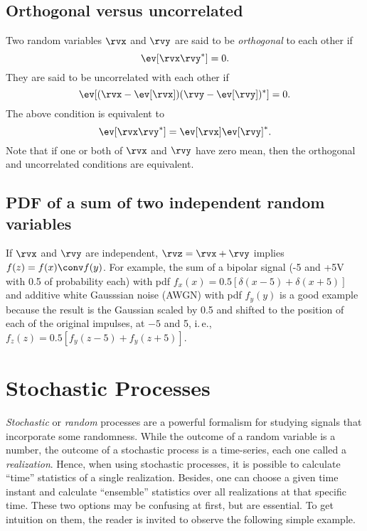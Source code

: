 \subsection{Orthogonal versus uncorrelated}

Two random variables $\rvx$ and $\rvy$ are said to be \emph{orthogonal} to each other if 
\[
\ev[\rvx \rvy^*]=0.
\]
They are said to be uncorrelated with each other if
\[
\ev[(\rvx-\ev[\rvx]) (\rvy-\ev[\rvy])^*]=0.
\]
The above condition is equivalent to
\[
\ev[\rvx \rvy^*]=\ev[\rvx]\ev[\rvy]^*.
\]
Note that if one or both of $\rvx$ and $\rvy$ have zero mean, then the orthogonal and uncorrelated conditions are equivalent.

 
\subsection{PDF of a sum of two independent random variables}

If $\rvx$ and $\rvy$ are independent, $\rvz=\rvx+\rvy$ implies $f(z) = f(x) \conv f(y)$. For example, the sum of a bipolar signal (-5 and +5V with 0.5 of probability each) with pdf $f_x(x) = 0.5 [\delta(x-5) + \delta(x+5)]$ and additive white Gausssian noise (AWGN) with pdf $f_y(y)$ is a good example because the result is the Gaussian scaled by 0.5 and shifted to the position of each of the original impulses, at $-5$ and 5, i.\,e., $f_z(z) = 0.5[f_y(z-5)+f_y(z+5)]$.


\section{Stochastic Processes}
\label{app:stochasticprocesses}

\emph{Stochastic} or \emph{random} processes are a powerful formalism for studying signals that incorporate some randomness. While the outcome of a random variable is a number, the outcome
of a stochastic process is a time-series, each one called a \emph{realization}. Hence, when using
stochastic processes, it is possible to calculate ``time'' statistics of a single realization.
Besides, one can choose a given time instant and calculate ``ensemble'' statistics over all
realizations at that specific time. These two options may be confusing at first, but are essential.
To get intuition on them, the reader is invited to observe the following simple example.

